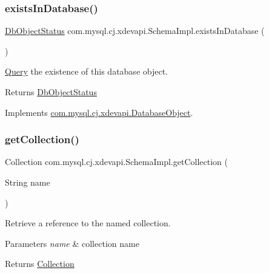 \subsubsection{\texorpdfstring{exists\+In\+Database()}{existsInDatabase()}}
{\footnotesize\ttfamily \mbox{\hyperlink{enumcom_1_1mysql_1_1cj_1_1xdevapi_1_1_database_object_1_1_db_object_status}{Db\+Object\+Status}} com.\+mysql.\+cj.\+xdevapi.\+Schema\+Impl.\+exists\+In\+Database (\begin{DoxyParamCaption}{ }\end{DoxyParamCaption})}

\mbox{\hyperlink{interfacecom_1_1mysql_1_1cj_1_1_query}{Query}} the existence of this database object.

\begin{DoxyReturn}{Returns}
\mbox{\hyperlink{}{Db\+Object\+Status}} 
\end{DoxyReturn}


Implements \mbox{\hyperlink{interfacecom_1_1mysql_1_1cj_1_1xdevapi_1_1_database_object_ab4215a82b546a9e1dcb344c339765d7a}{com.\+mysql.\+cj.\+xdevapi.\+Database\+Object}}.

\mbox{\label{classcom_1_1mysql_1_1cj_1_1xdevapi_1_1_schema_impl_abcdaa1e922b045e78ed4748279042ed9}} 
\subsubsection{\texorpdfstring{get\+Collection()}{getCollection()}\hspace{0.1cm}{\footnotesize\ttfamily [1/2]}}
{\footnotesize\ttfamily Collection com.\+mysql.\+cj.\+xdevapi.\+Schema\+Impl.\+get\+Collection (\begin{DoxyParamCaption}\item[{String}]{name }\end{DoxyParamCaption})}

Retrieve a reference to the named collection.


\begin{DoxyParams}{Parameters}
{\em name} & collection name \\
\hline
\end{DoxyParams}
\begin{DoxyReturn}{Returns}
\mbox{\hyperlink{interfacecom_1_1mysql_1_1cj_1_1xdevapi_1_1_collection}{Collection}} 
\end{DoxyReturn}


